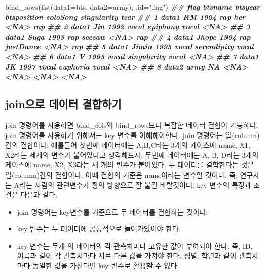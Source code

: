 \documentclass[
]{book}
\newenvironment{Shaded}{\begin{snugshade}}{\end{snugshade}}
\newcommand{\AttributeTok}[1]{\textcolor[rgb]{0.77,0.63,0.00}{#1}}
\newcommand{\DocumentationTok}[1]{\textcolor[rgb]{0.56,0.35,0.01}{\textbf{\textit{#1}}}}
\newcommand{\FunctionTok}[1]{\textcolor[rgb]{0.00,0.00,0.00}{#1}}
\newcommand{\NormalTok}[1]{#1}
\newcommand{\StringTok}[1]{\textcolor[rgb]{0.31,0.60,0.02}{#1}}
\providecommand{\tightlist}{%
  \setlength{\itemsep}{0pt}\setlength{\parskip}{0pt}}
\theoremstyle{definition}
\theoremstyle{definition}
\theoremstyle{definition}
\theoremstyle{definition}
\theoremstyle{remark}
\begin{document}
\begin{Shaded}
\begin{Highlighting}[]
\FunctionTok{bind\_rows}\NormalTok{(}\FunctionTok{list}\NormalTok{(}\AttributeTok{data1=}\NormalTok{bts, }\AttributeTok{data2=}\NormalTok{army), }\AttributeTok{.id=}\StringTok{"flag"}\NormalTok{)}
\DocumentationTok{\#\#    flag btsname btsyear btsposition    soloSong singularity tear}
\DocumentationTok{\#\# 1 data1      RM    1994         rap         her        \textless{}NA\textgreater{}  rap}
\DocumentationTok{\#\# 2 data1     Jin    1992       vocal    epiphany       vocal \textless{}NA\textgreater{}}
\DocumentationTok{\#\# 3 data1    Suga    1993         rap      seesaw        \textless{}NA\textgreater{}  rap}
\DocumentationTok{\#\# 4 data1   Jhope    1994         rap   justDance        \textless{}NA\textgreater{}  rap}
\DocumentationTok{\#\# 5 data1   Jimin    1995       vocal serendipity       vocal \textless{}NA\textgreater{}}
\DocumentationTok{\#\# 6 data1       V    1995       vocal singularity       vocal \textless{}NA\textgreater{}}
\DocumentationTok{\#\# 7 data1      JK    1997       vocal    euphoria       vocal \textless{}NA\textgreater{}}
\DocumentationTok{\#\# 8 data2    army      NA        \textless{}NA\textgreater{}        \textless{}NA\textgreater{}        \textless{}NA\textgreater{} \textless{}NA\textgreater{}}
\end{Highlighting}
\end{Shaded}

\hypertarget{joinuxc73cuxb85c-uxb370uxc774uxd130-uxacb0uxd569uxd558uxae30}{%
\subsection{join으로 데이터 결합하기}\label{joinuxc73cuxb85c-uxb370uxc774uxd130-uxacb0uxd569uxd558uxae30}}

join 명령어를 사용하면 bind\_cols와 bind\_rows보다 복잡한 데이터 결합이 가능하다. join 명령어를 사용하기 위해서는 key 변수를 이해해야한다. join 명령어는 열(column)간의 결합이다. 예를들어 첫번째 데이터에는 A,B,C라는 3개의 케이스에 name, X1, X2라는 세개의 변수가 붙어있다고 생각해보자. 두번째 데이터에는 A, B, D라는 3개의 케이스에 name, X2, X3라는 세 개의 변수가 붙어있다. 두 데이터를 결합한다는 것은 열(column)간의 결합이다. 이때 결합의 기준은 name이라는 변수일 것이다. 즉, 연구자는 A라는 사람의 관련변수가 횡의 방향으로 잘 붙길 바랄것이다. key 변수의 특징과 조건은 다음과 같다.

\begin{itemize}
\tightlist
\item
  join 명령어는 key변수를 기준으로 두 데이터를 결합하는 것이다.
\item
  key 변수는 두 데이터에 공통적으로 들어가있어야 한다.
\item
  key 변수는 두개 의 데이터의 각 관측치마다 고유한 값이 부여되야 한다. 즉, ID, 이름과 같이 각 관측치마다 서로 다른 값을 가져야 한다. 성별, 학년과 같이 관측치마다 동일한 값을 가진다면 key 변수로 활용할 수 없다.
\end{itemize}
\end{document}
